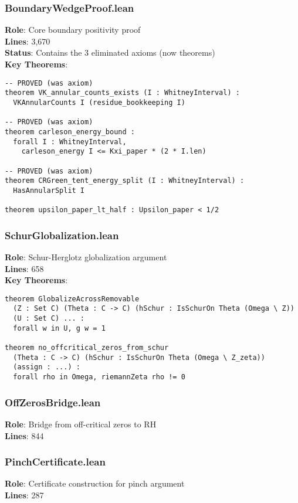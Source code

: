 \subsubsection{BoundaryWedgeProof.lean}
\textbf{Role}: \colorbox{yellow!30}{Core boundary positivity proof}\\
\textbf{Lines}: 3,670\\
\textbf{Status}: Contains the 3 eliminated axioms (now theorems)\\
\textbf{Key Theorems}:
\begin{lstlisting}[language=Lean]
-- PROVED (was axiom)
theorem VK_annular_counts_exists (I : WhitneyInterval) :
  VKAnnularCounts I (residue_bookkeeping I)

-- PROVED (was axiom)
theorem carleson_energy_bound :
  forall I : WhitneyInterval,
    carleson_energy I <= Kxi_paper * (2 * I.len)

-- PROVED (was axiom)
theorem CRGreen_tent_energy_split (I : WhitneyInterval) :
  HasAnnularSplit I

theorem upsilon_paper_lt_half : Upsilon_paper < 1/2
\end{lstlisting}

\subsubsection{SchurGlobalization.lean}
\textbf{Role}: Schur-Herglotz globalization argument\\
\textbf{Lines}: 658\\
\textbf{Key Theorems}:
\begin{lstlisting}[language=Lean]
theorem GlobalizeAcrossRemovable
  (Z : Set C) (Theta : C -> C) (hSchur : IsSchurOn Theta (Omega \ Z))
  (U : Set C) ... :
  forall w in U, g w = 1

theorem no_offcritical_zeros_from_schur
  (Theta : C -> C) (hSchur : IsSchurOn Theta (Omega \ Z_zeta))
  (assign : ...) :
  forall rho in Omega, riemannZeta rho != 0
\end{lstlisting}

\subsubsection{OffZerosBridge.lean}
\textbf{Role}: Bridge from off-critical zeros to RH\\
\textbf{Lines}: 844

\subsubsection{PinchCertificate.lean}
\textbf{Role}: Certificate construction for pinch argument\\
\textbf{Lines}: 287

